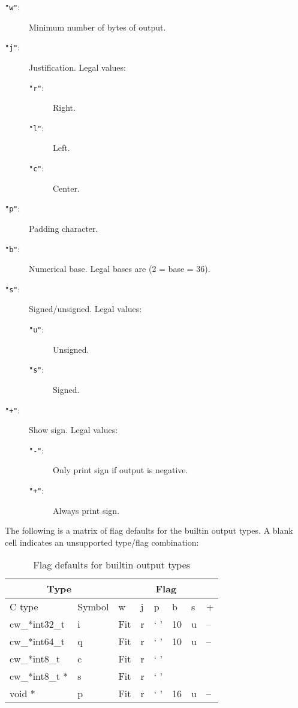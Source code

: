\begin{description}
\item[{\tt "w"}: ]
	Minimum number of bytes of output.
\item[{\tt "j"}: ]
	Justification.  Legal values:
	\begin{description}
	\item[{\tt "r"}: ]
		Right.
	\item[{\tt "l"}: ]
		Left.
	\item[{\tt "c"}: ]
		Center.
	\end{description}
\item[{\tt "p"}: ]
	 Padding character.
\item[{\tt "b"}: ]
	Numerical base.  Legal bases are (2 {\lt}= base {\lt}= 36).
\item[{\tt "s"}: ]
	Signed/unsigned.  Legal values:
	\begin{description}
	\item[{\tt "u"}: ]
		 Unsigned.
	\item[{\tt "s"}: ]
		Signed.
	\end{description}
\item[{\tt "+"}: ]
	Show sign.  Legal values:
	\begin{description}
	\item[{\tt "-"}: ]
		Only print sign if output is negative.
	\item[{\tt "+"}: ]
		Always print sign.
	\end{description}
\end{description}

The following is a matrix of flag defaults for the builtin output types.  A
blank cell indicates an unsupported type/flag combination:
\begin{table}[htb]
\begin{center}
\begin{tabular}{|l|l||l|l|l|l|l|l|}
\hline
\multicolumn{2}{|c||}{Type} & \multicolumn{6}{c|}{Flag} \\
\hline
C type		& Symbol & w	& j	& p	& b	& s	& +	\\
\hline \hline
cw\_*int32\_t	& i	& Fit	& r	& ` '	& 10	& u	& --	\\
\hline
cw\_*int64\_t	& q	& Fit	& r	& ` '	& 10	& u	& --	\\
\hline
cw\_*int8\_t	& c	& Fit	& r	& ` '	&	&	&	\\
\hline
cw\_*int8\_t *	& s	& Fit	& r	& ` '	&	&	&	\\
\hline
void *		& p	& Fit	& r	& ` '	& 16	& u	& --	\\
\hline
\end{tabular}
\end{center}
\caption{Flag defaults for builtin output types}
\end{table}

